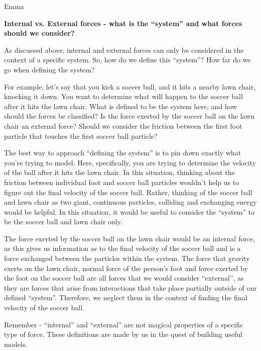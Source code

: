 \begin{studentOpinion}{Emma}

\textbf{Internal vs. External forces - what is the ``system'' and what forces should we consider?}

As discussed above, internal and external forces can only be considered in the context of a specific system. So, how do we define this ``system''? How far do we go when defining the system?

For example, let's say that you kick a soccer ball, and it hits a nearby lawn chair, knocking it down. You want to determine what will happen to the soccer ball after it hits the lawn chair. What is defined to be the system here, and how should the forces be classified? Is the force exerted by the soccer ball on the lawn chair an external force? Should we consider the friction between the first foot particle that touches the first soccer ball particle?

The best way to approach ``defining the system'' is to pin down exactly what you're trying to model. Here, specifically, you are trying to determine the velocity of the ball after it hits the lawn chair. In this situation, thinking about the friction between individual foot and soccer ball particles wouldn't help us to figure out the final velocity of the soccer ball. Rather, thinking of the soccer ball and lawn chair as two giant, continuous particles, colliding and exchanging energy would be helpful. In this situation, it would be useful to consider the ``system'' to be the soccer ball and lawn chair only.

 The force exerted by the soccer ball on the lawn chair would be an internal force, as this gives us information as to the final velocity of the soccer ball and is a force exchanged between the particles within the system. The force that gravity exerts on the lawn chair, normal force of the person's foot and force exerted by the foot on the soccer ball are all forces that we would consider ``external'', as they are forces that arise from interactions that take place partially outside of our defined ``system''. Therefore, we neglect them in the context of finding the final velocity of the soccer ball.

Remember - ``internal'' and ``external'' are not magical properties of a specific type of force. These definitions are made by us in the quest of building useful models.
\end{studentOpinion}

